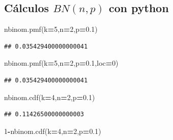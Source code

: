 \documentclass[]{book}
\newenvironment{Shaded}{\begin{snugshade}}{\end{snugshade}}
\newcommand{\DecValTok}[1]{\textcolor[rgb]{0.00,0.00,0.81}{#1}}
\newcommand{\FloatTok}[1]{\textcolor[rgb]{0.00,0.00,0.81}{#1}}
\newcommand{\NormalTok}[1]{#1}
\newcommand{\OperatorTok}[1]{\textcolor[rgb]{0.81,0.36,0.00}{\textbf{#1}}}
\begin{document}
\hypertarget{cuxe1lculos-bnnp-con-python}{%
\subsection{\texorpdfstring{Cálculos \(BN(n,p)\) con python}{Cálculos BN(n,p) con python}}\label{cuxe1lculos-bnnp-con-python}}

\begin{Shaded}
\begin{Highlighting}[]
\NormalTok{nbinom.pmf(k}\OperatorTok{=}\DecValTok{5}\NormalTok{,n}\OperatorTok{=}\DecValTok{2}\NormalTok{,p}\OperatorTok{=}\FloatTok{0.1}\NormalTok{)}
\end{Highlighting}
\end{Shaded}

\begin{verbatim}
## 0.035429400000000041
\end{verbatim}

\begin{Shaded}
\begin{Highlighting}[]
\NormalTok{nbinom.pmf(k}\OperatorTok{=}\DecValTok{5}\NormalTok{,n}\OperatorTok{=}\DecValTok{2}\NormalTok{,p}\OperatorTok{=}\FloatTok{0.1}\NormalTok{,loc}\OperatorTok{=}\DecValTok{0}\NormalTok{)}
\end{Highlighting}
\end{Shaded}

\begin{verbatim}
## 0.035429400000000041
\end{verbatim}

\begin{Shaded}
\begin{Highlighting}[]
\NormalTok{nbinom.cdf(k}\OperatorTok{=}\DecValTok{4}\NormalTok{,n}\OperatorTok{=}\DecValTok{2}\NormalTok{,p}\OperatorTok{=}\FloatTok{0.1}\NormalTok{)}
\end{Highlighting}
\end{Shaded}

\begin{verbatim}
## 0.11426500000000003
\end{verbatim}

\begin{Shaded}
\begin{Highlighting}[]
\DecValTok{1}\OperatorTok{-}\NormalTok{nbinom.cdf(k}\OperatorTok{=}\DecValTok{4}\NormalTok{,n}\OperatorTok{=}\DecValTok{2}\NormalTok{,p}\OperatorTok{=}\FloatTok{0.1}\NormalTok{)}
\end{Highlighting}
\end{Shaded}
\end{document}
